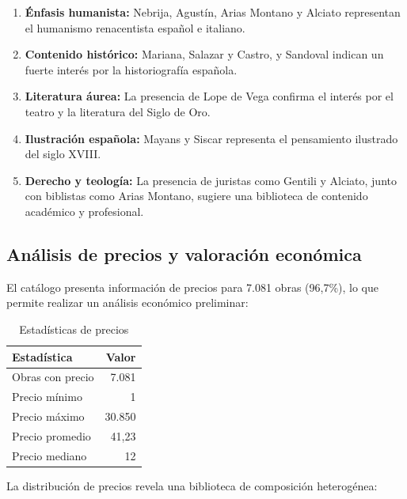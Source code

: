\documentclass[12pt,a4paper]{article}
\begin{document}
\begin{enumerate}
    \item \textbf{Énfasis humanista:} Nebrija, Agustín, Arias Montano y Alciato representan el humanismo renacentista español e italiano.

    \item \textbf{Contenido histórico:} Mariana, Salazar y Castro, y Sandoval indican un fuerte interés por la historiografía española.

    \item \textbf{Literatura áurea:} La presencia de Lope de Vega confirma el interés por el teatro y la literatura del Siglo de Oro.

    \item \textbf{Ilustración española:} Mayans y Siscar representa el pensamiento ilustrado del siglo XVIII.

    \item \textbf{Derecho y teología:} La presencia de juristas como Gentili y Alciato, junto con biblistas como Arias Montano, sugiere una biblioteca de contenido académico y profesional.
\end{enumerate}

\subsection{Análisis de precios y valoración económica}

El catálogo presenta información de precios para 7.081 obras (96,7\%), lo que permite realizar un análisis económico preliminar:

\begin{table}[h]
\centering
\caption{Estadísticas de precios}
\label{tab:precios}
\begin{tabular}{lr}
\toprule
\textbf{Estadística} & \textbf{Valor} \\
\midrule
Obras con precio & 7.081 \\
Precio mínimo & 1 \\
Precio máximo & 30.850 \\
Precio promedio & 41,23 \\
Precio mediano & 12 \\
\bottomrule
\end{tabular}
\end{table}

La distribución de precios revela una biblioteca de composición heterogénea:
\end{document}
